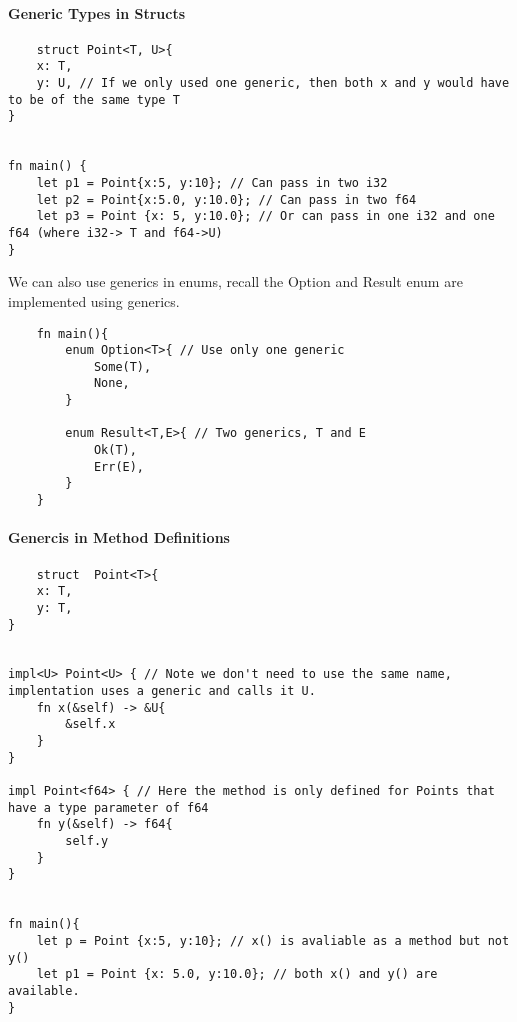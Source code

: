 \paragraph*{Generic Types in Structs}
\begin{lstlisting}
    struct Point<T, U>{
    x: T,
    y: U, // If we only used one generic, then both x and y would have to be of the same type T
}


fn main() {
    let p1 = Point{x:5, y:10}; // Can pass in two i32
    let p2 = Point{x:5.0, y:10.0}; // Can pass in two f64
    let p3 = Point {x: 5, y:10.0}; // Or can pass in one i32 and one f64 (where i32-> T and f64->U)
}
\end{lstlisting}

We can also use generics in enums, recall the Option and Result enum are implemented using generics.

\begin{lstlisting}
    fn main(){
        enum Option<T>{ // Use only one generic
            Some(T),
            None,
        }

        enum Result<T,E>{ // Two generics, T and E
            Ok(T),
            Err(E),
        }
    }
\end{lstlisting}

\paragraph*{Genercis in Method Definitions}
\begin{lstlisting}
    struct  Point<T>{
    x: T,
    y: T,
}


impl<U> Point<U> { // Note we don't need to use the same name, implentation uses a generic and calls it U.
    fn x(&self) -> &U{
        &self.x
    }
}

impl Point<f64> { // Here the method is only defined for Points that have a type parameter of f64
    fn y(&self) -> f64{
        self.y
    }
}


fn main(){
    let p = Point {x:5, y:10}; // x() is avaliable as a method but not y()
    let p1 = Point {x: 5.0, y:10.0}; // both x() and y() are available.
}
\end{lstlisting}

